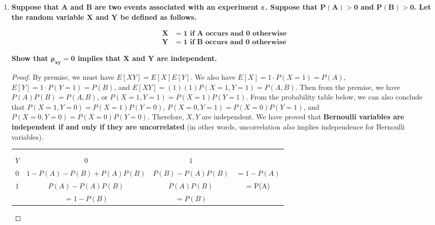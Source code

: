 \documentclass[10pt, oneside]{article}   	%
\theoremstyle{definition}
\begin{document}
\begin{enumerate}[label=7.\arabic*]
\item  \begin{tcolorbox}[
  colback=Cerulean!5!white,
  colframe=Cerulean!75!black]
  \textbf{Suppose that $\bm{A}$ and $\bm{B}$ are two events associated with an experiment $\bm{\varepsilon}$. Suppose that $\bm{P(A) > 0}$ and $\bm{P(B) > 0}$. Let the random variable $\bm{X}$ and $\bm{Y}$ be defined as follows.}
  
  \begin{align*}
  \bm{X} &\bm{= 1} \textbf{ if } \bm{A} \textbf{ occurs and } \bm{0} \textbf{ otherwise} \\
  \bm{Y} &\bm{= 1} \textbf{ if } \bm{B} \textbf{ occurs and } \bm{0} \textbf{ otherwise} 
  \end{align*}
  
  \textbf{Show that $\bm{\rho_{xy} = 0}$ implies that $\bm{X}$ and $\bm{Y}$ are independent.}
  \end{tcolorbox}
  
  \begin{proof}
  By premise, we must have $E[XY] = E[X] E[Y]$. We also have $E[X] = 1 \cdot P(X = 1) = P(A)$, $E[Y] = 1 \cdot P(Y = 1) = P(B)$, and $E[XY] = (1)(1) P(X = 1, Y = 1) = P(A,B)$. Then from the premise, we have $P(A) P(B) = P(A,B)$, or $P(X = 1, Y = 1) = P(X = 1) P(Y = 1)$. From the probability table below, we can also conclude that $P(X = 1, Y = 0) = P(X = 1) P(Y = 0)$, $P(X = 0, Y = 1) = P(X = 0) P(Y = 1)$, and $P(X = 0, Y = 0) = P(X = 0) P(Y = 0)$. Therefore, $X, Y$ are independent. We have proved that \textbf{Bernoulli variables are independent if and only if they are uncorrelated} (in other words, uncorrelation \textit{also} implies independence for Bernoulli variables). 
  
\begin{center}
\begin{tabular}{|c | c | c | c |} 
 \hline
  \diagbox{$X$\\}{\\$Y$} & $0$ & $1$ & \\ 
 \hline\hline 
 $0$ & $1 - P(A) - P(B) + P(A)P(B)$ & $P(B) - P(A)P(B)$ & $= 1 - P(A)$ \\ 
 \hline
 $1$ & $P(A) - P(A)P(B)$ & $P(A)P(B)$ & = P(A) \\ 
 \hline
  & $= 1 - P(B)$ & $= P(B)$ & \\
  \hline
\end{tabular}
\end{center}
  
  \end{proof}
  

\end{enumerate}
\end{document}
